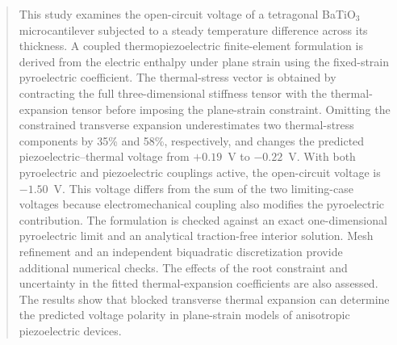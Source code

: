 \documentclass[a4paper,11pt]{article}
\begin{document}
\fi
\begin{abstract}
This study examines the open-circuit voltage of a tetragonal BaTiO$_3$ microcantilever subjected to a steady temperature difference across its thickness. A coupled thermopiezoelectric finite-element formulation is derived from the electric enthalpy under plane strain using the fixed-strain pyroelectric coefficient. The thermal-stress vector is obtained by contracting the full three-dimensional stiffness tensor with the thermal-expansion tensor before imposing the plane-strain constraint. Omitting the constrained transverse expansion underestimates two thermal-stress components by 35\% and 58\%, respectively, and changes the predicted piezoelectric--thermal voltage from $+0.19$~V to $-0.22$~V. With both pyroelectric and piezoelectric couplings active, the open-circuit voltage is $-1.50$~V. This voltage differs from the sum of the two limiting-case voltages because electromechanical coupling also modifies the pyroelectric contribution. The formulation is checked against an exact one-dimensional pyroelectric limit and an analytical traction-free interior solution. Mesh refinement and an independent biquadratic discretization provide additional numerical checks. The effects of the root constraint and uncertainty in the fitted thermal-expansion coefficients are also assessed. The results show that blocked transverse thermal expansion can determine the predicted voltage polarity in plane-strain models of anisotropic piezoelectric devices.
\end{abstract}

\ifdefined\FINELManuscriptMode
\else
\end{document}
